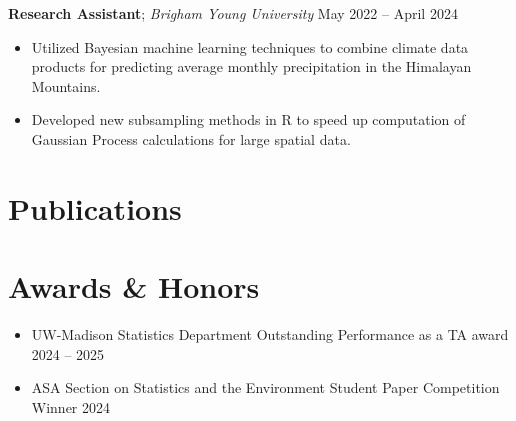 \documentclass[11pt, letterpaper]{article}
\begin{document}
\vspace{6pt}
\textbf{Research Assistant}; \textit{ Brigham Young University} \hfill May 2022 -- April 2024 
\begin{itemize}
    \item Utilized Bayesian machine learning techniques to combine climate data products for predicting average monthly precipitation in the Himalayan Mountains.
    \item Developed new subsampling methods in R to speed up computation of Gaussian Process calculations for large spatial data.
\end{itemize}


\section{Publications}
\nocite{*} 
\printbibliography[heading=none] 


\section{Awards \& Honors}
\begin{itemize}
    \item UW-Madison Statistics Department Outstanding Performance as a TA award \hfill 2024 -- 2025
    \item ASA Section on Statistics and the Environment Student Paper Competition Winner \hfill 2024
\end{itemize}
\end{document}
